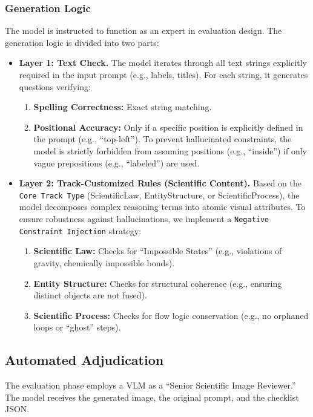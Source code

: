 \documentclass[runningheads]{llncs}
\begin{document}
\subsubsection{Generation Logic}
The model is instructed to function as an expert in evaluation design. The generation logic is divided into two parts:

\begin{itemize}
    \item \textbf{Layer 1: Text Check.} 
    The model iterates through all text strings explicitly required in the input prompt (e.g., labels, titles). For each string, it generates questions verifying:
    \begin{enumerate}
        \item \textbf{Spelling Correctness:} Exact string matching.
        \item \textbf{Positional Accuracy:} Only if a specific position is explicitly defined in the prompt (e.g., ``top-left''). To prevent hallucinated constraints, the model is strictly forbidden from assuming positions (e.g., ``inside'') if only vague prepositions (e.g., ``labeled'') are used.
    \end{enumerate}
    
    \item \textbf{Layer 2: Track-Customized Rules (Scientific Content).} 
    Based on the \texttt{Core Track Type} (ScientificLaw, EntityStructure, or ScientificProcess), the model decomposes complex reasoning terms into atomic visual attributes. To ensure robustness against hallucinations, we implement a \texttt{Negative Constraint Injection} strategy:
    \begin{enumerate}
        \item \textbf{Scientific Law:} Checks for ``Impossible States'' (e.g., violations of gravity, chemically impossible bonds).
        \item \textbf{Entity Structure:} Checks for structural coherence (e.g., ensuring distinct objects are not fused).
        \item \textbf{Scientific Process:} Checks for flow logic conservation (e.g., no orphaned loops or ``ghost'' steps).
    \end{enumerate}
\end{itemize}

\subsection{Automated Adjudication}
The evaluation phase employs a VLM as a ``Senior Scientific Image Reviewer.'' The model receives the generated image, the original prompt, and the checklist JSON. 
\end{document}
